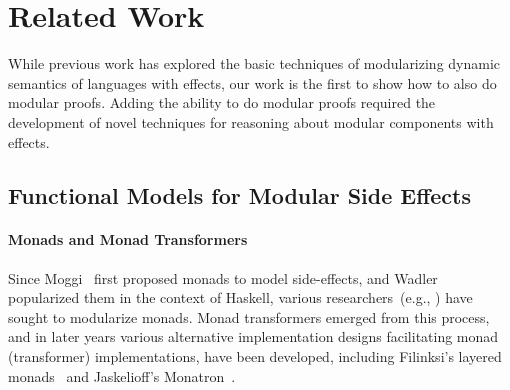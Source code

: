 \HaskellReset

\makeatother
\EndFmtInput



\section{Related Work}


While previous work has explored the basic techniques of modularizing
dynamic semantics of languages with effects, our work is the first to
show how to also do modular proofs. Adding the ability to do modular
proofs required the development of novel techniques for reasoning about
modular components with effects.


\subsection{Functional Models for Modular Side Effects}


\paragraph{Monads and Monad Transformers}
Since Moggi~\cite{Moggi89a} first proposed monads to model side-effects, and
Wadler~\cite{Wadler92a} popularized them in the context of Haskell, various
researchers~(e.g., \cite{jones93,steele}) have sought to modularize monads.
Monad transformers emerged \cite{cenciarelli93asyntactic,liang95monad} from this process, and in later
years various alternative implementation designs facilitating monad
(transformer) implementations, have been developed, including Filinksi's 
layered monads~\cite{Filinski:LayeredMonads} and Jaskelioff's Monatron~\cite{monatron}.

